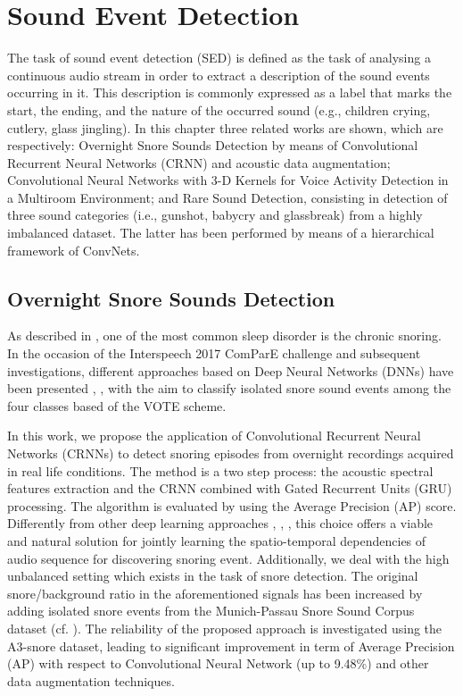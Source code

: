 \chapter{Sound Event Detection}

The task of sound event detection (SED) is defined as the task of analysing a continuous audio stream in order to extract a description of the sound events occurring in it. This description is commonly expressed as a label that marks the start, the ending, and the nature of the occurred sound (e.g., children crying, cutlery, glass jingling). In this chapter three related works are shown, which are respectively: Overnight Snore Sounds Detection by means of Convolutional Recurrent Neural Networks (CRNN) and acoustic data augmentation; Convolutional Neural Networks with 3-D Kernels for Voice Activity Detection in a Multiroom Environment; and Rare Sound Detection, consisting in detection of three sound categories (i.e., gunshot, babycry and glassbreak) from a highly imbalanced dataset. The latter has been performed by means of a hierarchical framework of ConvNets.

\section{Overnight Snore Sounds Detection}

As described in , one of the most common sleep disorder is the chronic snoring. In the occasion of the Interspeech 2017 ComParE challenge \cite{ComParE2017} and subsequent investigations, different approaches based on Deep Neural Networks (DNNs) have been presented \cite{amiriparian2017snore}, \cite{freitag2017end}, \cite{vesperini2018snore} with the aim to classify isolated snore sound events among the four classes based of the VOTE scheme.

In this work, we propose the application of Convolutional Recurrent Neural Networks (CRNNs) to detect snoring episodes from overnight recordings acquired in real life conditions. The method is a two step process: the acoustic spectral features extraction and the CRNN combined with Gated Recurrent Units (GRU) processing. The algorithm is evaluated by using the Average Precision (AP) score.
Differently from other deep learning approaches \cite{amiriparian2017snore}, \cite{freitag2017end}, \cite{vesperini2018snore}, this choice offers a viable and natural solution for jointly learning the spatio-temporal dependencies of audio sequence for discovering snoring event. Additionally, we deal with the high unbalanced setting which exists in the task of snore detection. The original snore/background ratio in the aforementioned signals has been increased by adding isolated snore events from the Munich-Passau Snore Sound Corpus dataset \cite{ComParE2017} (cf. ). The reliability of the proposed approach is investigated using the A3-snore dataset, leading to significant improvement in term of Average Precision (AP) with respect to Convolutional Neural Network (up to 9.48\%) and other data augmentation techniques.


